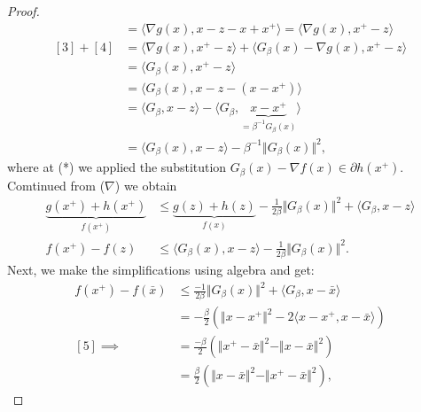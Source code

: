 \documentclass[]{article}
\theoremstyle{definition}
\begin{document}
\begin{proof}
\begin{align*}
                [3] &= \langle \nabla g(x), x - z - x + x^+\rangle = \langle \nabla g(x), x^+ - z\rangle
                \\
                [3] + [4] &= 
                \langle \nabla g(x), x^+ - z\rangle + \langle G_\beta(x) - \nabla g(x), x^+ - z\rangle \tag{**}
                \\
                &= \langle G_\beta(x), x^+ - z\rangle 
                \\
                &= \langle G_\beta(x), x - z - (x - x^+)\rangle
                \\
                &= \langle G_\beta, x - z\rangle - \langle G_\beta, \underbrace{x - x^+}_{ = \beta^{-1}G_\beta(x)}\rangle
                \\
                &= \langle G_\beta(x), x - z\rangle - \beta^{-1}\Vert G_\beta(x)\Vert^2, 
            \end{align*}
            where at (*) we applied the substitution $G_\beta (x) - \nabla f(x)\in \partial h(x^+)$. 
            Comtinued from ($\nabla$) we obtain 
            \begin{align*}
                \underbrace{g(x^+) + h(x^+)}_{f(x^+)}
                & \le 
                \underbrace{g(z) + h(z)}_{f(x)} - \frac{1}{2\beta}\Vert G_\beta(x)\Vert^2 + \langle G_\beta, x - z\rangle
                \\
                f(x^+) - f(z) 
                &\le 
                \langle G_\beta(x), x - z\rangle - \frac{1}{2\beta}\Vert G_\beta(x)\Vert^2. \tag{$\star$}
            \end{align*}
            Next, we make the simplifications using algebra and get: 
            \begin{align*}
                f(x^+) - f(\bar x) 
                &\le 
                \frac{-1}{2\beta}\Vert G_\beta(x)\Vert^2
                + 
                \langle G_\beta, x - \bar x\rangle
                \\
                &= 
                -\frac{\beta}{2}(
                    \Vert x - x^+\Vert^2 - 2\langle x - x^+, x - \bar x\rangle
                )
                \\
                [5]
                \implies &= 
                \frac{-\beta}{2}(
                    \Vert x^+ - \bar x\Vert^2
                    - 
                    \Vert x - \bar x\Vert^2
                )
                \\
                &= 
                \frac{\beta}{2}(\Vert x - \bar x\Vert^2 - \Vert x^+ - \bar x\Vert^2), 

\end{align*}
\end{proof}
\end{document}
